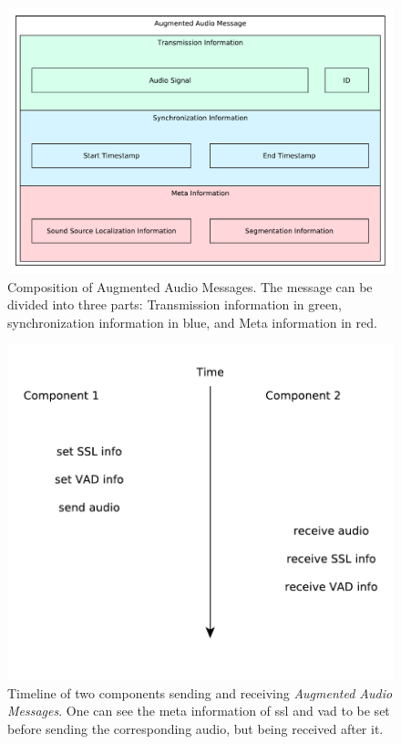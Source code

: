 
\begin{figure}[]
	\centering
	\includegraphics[width=\textwidth]{bilder/rosmsg/augmented_audio.pdf}
	\caption{Composition of Augmented Audio Messages.
		The message can be divided into three parts:
		Transmission information in green, synchronization information in blue, and Meta information in red.}
	\label{pic:main:lib:augmented_audio}
\end{figure}

\begin{figure}[]
	\centering
	\includegraphics[width=\textwidth]{diagrams/lib_ssl_vad_time.pdf}
	\caption{Timeline of two components sending and receiving \textit{Augmented Audio Messages}.
		One can see the meta information of \gls{ssl} and \gls{vad} to be set before sending the corresponding audio, but being received after it.}
	\label{pic:main:lib:ssl_vad_time}
\end{figure}

